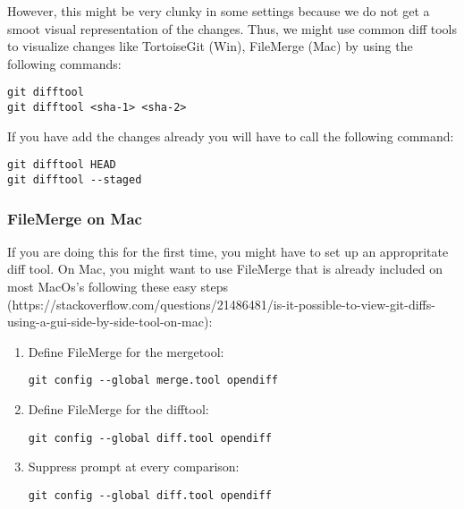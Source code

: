 \documentclass{article}
\begin{document}
However, this might be very clunky in some settings because we do not get a smoot visual representation of the changes. Thus, we might use common diff tools to visualize changes like TortoiseGit (Win), FileMerge (Mac) by using the following commands:
\begin{verbatim}
git difftool
git difftool <sha-1> <sha-2>
\end{verbatim}
If you have add the changes already you will have to call the following command:
\begin{verbatim}
git difftool HEAD
git difftool --staged
\end{verbatim}

\subsubsection{FileMerge on Mac}
If you are doing this for the first time, you might have to set up an appropritate diff tool.
On Mac, you might want to use FileMerge that is already included on most MacOs's following these easy steps (https://stackoverflow.com/questions/21486481/is-it-possible-to-view-git-diffs-using-a-gui-side-by-side-tool-on-mac):
\begin{enumerate}
    \item Define FileMerge for the mergetool:
    \begin{verbatim}
git config --global merge.tool opendiff
    \end{verbatim}
    \item Define FileMerge for the difftool:
    \begin{verbatim}
git config --global diff.tool opendiff	
    \end{verbatim}		
    \item Suppress prompt at every comparison:
    \begin{verbatim}
git config --global diff.tool opendiff
    \end{verbatim}	
\end{enumerate}
\end{document}
